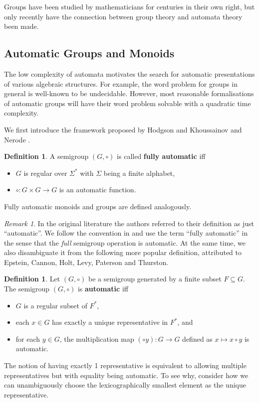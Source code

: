 \documentclass[british,a4paper,]{scrartcl}
\theoremstyle{definition}
\newtheorem{definition}[theorem]{Definition}
\theoremstyle{remark}
\newtheorem*{remark}{Remark}
\begin{document}
Groups have been studied by mathematicians for centuries in their own right,
but only recently have the connection between group theory and automata theory been made. \autocite{Ho76,Ho83,KN,Epstein}

\subsection{Automatic Groups and Monoids}

The low complexity of automata motivates the search for automatic presentations of various algebraic structures.
For example,
the word problem for groups in general is well-known to be undecidable.
However, most reasonable formalisations of automatic groups will have their word problem solvable with a
quadratic time complexity. \autocite{Epstein,KKM}

We first introduce the framework proposed by Hodgson \autocite{Ho76, Ho83} and
Khoussainov and Nerode \autocite{KN}.
\begin{definition} \label{defn:fullyauto}
     A semigroup \((G,\circ)\) is called \textbf{fully automatic} iff
     \begin{itemize}
         \item \(G\) is regular over \(\Sigma^*\) with \(\Sigma\) being a finite alphabet,
         \item \(\circ: G\times G \to G\) is an automatic function.
     \end{itemize}
     Fully automatic monoids and groups are defined analogously.
\end{definition}
\begin{remark}
    In the original literature the authors referred to their definition as just ``automatic''.
    We follow the convention in \autocite{fullautomatatheory} and use the term ``fully automatic''
    in the sense that the \emph{full} semigroup operation is automatic.
    At the same time, we also disambiguate it from the following more popular definition,
    attributed to Epstein, Cannon, Holt, Levy, Paterson and Thurston. \autocite{Epstein}
\end{remark}

\begin{definition} \label{defn:epsteinauto}
    Let \((G, \circ)\) be a semigroup generated by a finite subset \(F \subseteq G\).
    The semigroup \((G, \circ)\) is \textbf{automatic} iff
    \begin{itemize}
        \item \(G\) is a regular subset of \(F^*\),
        \item each \(x\in G\) has exactly a unique representative in \(F^*\), and
        \item for each \(y \in G\), the multiplication map \((\circ y) : G \to G\) defined
            as \(x \mapsto x\circ y\) is automatic.
    \end{itemize}
    The notion of having exactly 1 representative is equivalent to allowing multiple representatives but
    with equality being automatic.
    To see why, consider how we can unambiguously choose the
    lexicographically smallest element as the unique representative.
\end{definition}
\end{document}
